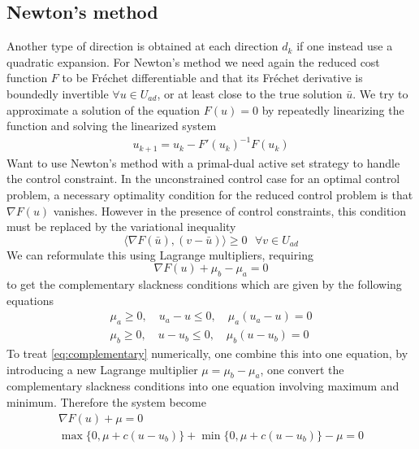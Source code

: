 \subsection{Newton's method}
Another type of direction is obtained at each direction $d_k$ if one instead use a quadratic expansion. For Newton's method we need again the reduced cost function $F$ to be Fréchet differentiable and that its Fréchet derivative is boundedly invertible $\forall u \in U_{ad}$, or at least close to the true solution $\bar{u}$. We try to approximate a solution of the equation $F(u) = 0$ by repeatedly linearizing the function and solving the linearized system
\begin{align}
    \label{eq:Newton}
    u_{k+1} = u_k - F'(u_k)^{-1}F(u_k)
\end{align}
Want to use Newton's method with a primal-dual active set strategy to handle the control constraint. In the unconstrained control case for an optimal control problem, a necessary optimality condition for the reduced control problem is that $\nabla F(u)$ vanishes. However in the presence of control constraints, this condition must be replaced by the variational inequality
\begin{equation}
    \langle \nabla F(\bar{u}), (v-\bar{u}) \rangle \geq 0 \text{ } \forall v \in U_{ad}
\end{equation}
We can reformulate this using Lagrange multipliers, requiring 
\begin{equation*}
    \nabla F(u) + \mu_b - \mu_a =0 
\end{equation*}
to get the complementary slackness conditions which are given by the following equations 
\begin{align}
    \label{eq:complementary}
    \mu_a \geq 0, \quad u_a - u \leq 0, \quad \mu_a(u_a - u) = 0 \\
    \mu_b \geq 0, \quad u - u_b \leq 0, \quad \mu_b(u-u_b) =0
\end{align}
To treat \eqref{eq:complementary} numerically, one combine this into one equation, by introducing a new Lagrange multiplier $\mu = \mu_b - \mu_a$, one convert the complementary slackness conditions into one equation involving maximum and minimum. Therefore the system become 
\begin{align}
    \label{eq:finalComp}
    \nabla F(u) + \mu = 0 \\
    \max \{0, \mu + c(u-u_b) \} + \min \{0, \mu + c(u-u_b) \} - \mu = 0
\end{align}

